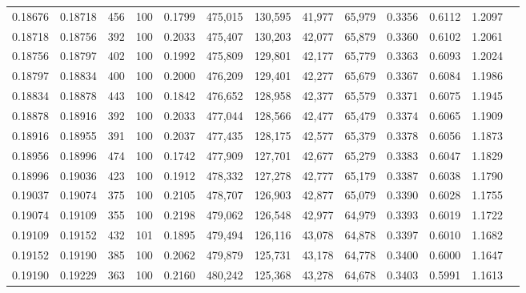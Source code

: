 \begin{tabular}{rrrrrrrrrrrrr}
0.18676 & 0.18718 &   456 & 100 &                                     0.1799 & 475,015 & 130,595 &  41,977 &  65,979 & 0.3356 & 0.6112 & 1.2097 \\
0.18718 & 0.18756 &   392 & 100 &                                     0.2033 & 475,407 & 130,203 &  42,077 &  65,879 & 0.3360 & 0.6102 & 1.2061 \\
0.18756 & 0.18797 &   402 & 100 &                                     0.1992 & 475,809 & 129,801 &  42,177 &  65,779 & 0.3363 & 0.6093 & 1.2024 \\
0.18797 & 0.18834 &   400 & 100 &                                     0.2000 & 476,209 & 129,401 &  42,277 &  65,679 & 0.3367 & 0.6084 & 1.1986 \\
0.18834 & 0.18878 &   443 & 100 &                                     0.1842 & 476,652 & 128,958 &  42,377 &  65,579 & 0.3371 & 0.6075 & 1.1945 \\
0.18878 & 0.18916 &   392 & 100 &                                     0.2033 & 477,044 & 128,566 &  42,477 &  65,479 & 0.3374 & 0.6065 & 1.1909 \\
0.18916 & 0.18955 &   391 & 100 &                                     0.2037 & 477,435 & 128,175 &  42,577 &  65,379 & 0.3378 & 0.6056 & 1.1873 \\
0.18956 & 0.18996 &   474 & 100 &                                     0.1742 & 477,909 & 127,701 &  42,677 &  65,279 & 0.3383 & 0.6047 & 1.1829 \\
0.18996 & 0.19036 &   423 & 100 &                                     0.1912 & 478,332 & 127,278 &  42,777 &  65,179 & 0.3387 & 0.6038 & 1.1790 \\
0.19037 & 0.19074 &   375 & 100 &                                     0.2105 & 478,707 & 126,903 &  42,877 &  65,079 & 0.3390 & 0.6028 & 1.1755 \\
0.19074 & 0.19109 &   355 & 100 &                                     0.2198 & 479,062 & 126,548 &  42,977 &  64,979 & 0.3393 & 0.6019 & 1.1722 \\
0.19109 & 0.19152 &   432 & 101 &                                     0.1895 & 479,494 & 126,116 &  43,078 &  64,878 & 0.3397 & 0.6010 & 1.1682 \\
0.19152 & 0.19190 &   385 & 100 &                                     0.2062 & 479,879 & 125,731 &  43,178 &  64,778 & 0.3400 & 0.6000 & 1.1647 \\
0.19190 & 0.19229 &   363 & 100 &                                     0.2160 & 480,242 & 125,368 &  43,278 &  64,678 & 0.3403 & 0.5991 & 1.1613 \\

\end{tabular}
